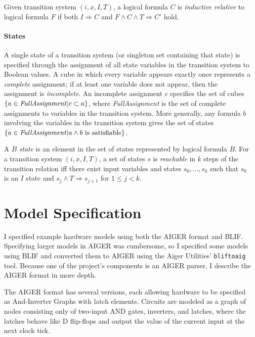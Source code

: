 \documentclass[12pt,a4paper,twoside,openright]{report}
\begin{document}
{{Given transition system $(i,x,I,T)$, a logical formula $C$ is
\emph{inductive relative} to logical formula $F$ if both
$I \Rightarrow C$ and $F \wedge C \wedge T \Rightarrow C'$ hold.
}

\paragraph{States}{
A single state of a transition system (or singleton set containing that state)
is specified through the assignment of all state variables in the transition system
to Boolean values.
A cube in which every variable
appears exactly once represents a \emph{complete} assignment;
if at least one variable does not appear, then the assignment
is \emph{incomplete}.
An incomplete
assignment $c$ specifies the set of cubes $\{a \in{\it FullAssignment}|c \subset a\}$,
where {\it FullAssignment} is the set of complete assignments to variables in the
transition system.
More generally, any formula $b$ involving the variables in the transition
system gives the set of states
$\{a \in {\it FullAssignment} | a \wedge b~{\rm is~satisfiable}\}$.

A \emph{$B$ state} is an element in the set of states
represented
by logical formula $B$.
For a transition system $(i, x, I, T)$, a
set of states $s$ is \emph{reachable}
in $k$ steps of the transition relation iff there exist input variables and
states $s_0, \ldots, s_k$ such that
$s_0$ is an $I$ state and $s_j \wedge T \Rightarrow s_{j + 1}$ for $1 \leq j < k$.
}


\section{Model Specification}
\label{prep:aiger}


I specified example hardware models using
both the AIGER format and BLIF.
Specifying larger models in AIGER was cumbersome, so
I specified some models using BLIF and converted them to AIGER
using the Aiger Utilities' \verb,bliftoaig, tool. Because one of
the project's components is an AIGER parser, I describe the AIGER format
in more depth.

The AIGER format has several versions, each allowing hardware to be
specified as
And-Inverter Graphs with latch elements.
Circuits are modeled as a graph of nodes consisting only of
two-input AND gates, inverters, and latches, where the latches behave like D
flip-flops and output the value of the current input at the next
clock tick.

}
\end{document}
